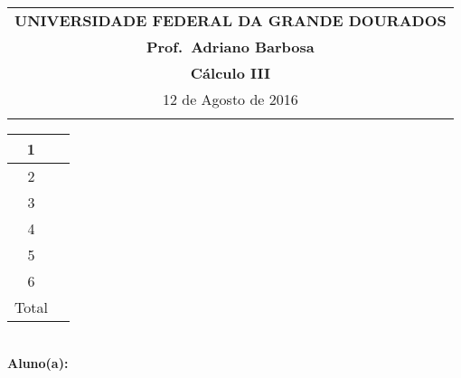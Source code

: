 \documentclass[a4paper,5pt]{amsbook}
\begin{document}
\thispagestyle{empty}
\begin{minipage}[b]{0.45\linewidth}
\begin{tabular}{c}
\toprule{}
{{\bf UNIVERSIDADE FEDERAL DA GRANDE DOURADOS}}\\
{{\bf Prof.\ Adriano Barbosa}}\\



{{\bf C\'alculo III}}\\

\midrule{}
\hspace{8cm}12 de Agosto de 2016  \\
\bottomrule{}
\end{tabular}
%
\end{minipage} \hfill
\begin{minipage}[b]{0.58\linewidth}
\begin{flushright}
\def\arraystretch{1.2}
\begin{tabular}{|c|c|}
\hline\hline
1 & \hspace{1.2cm} \\
\hline
2& \\
\hline
3& \\
\hline
4&  \\
\hline
5&  \\
\hline
6&  \\
\hline
{\small Total}&  \\
\hline\hline
\end{tabular}
\end{flushright}
\end{minipage} \hfill
\vspace{0.3cm}\\
{\bf Aluno(a):}\dotfill{} \\
\end{document}
